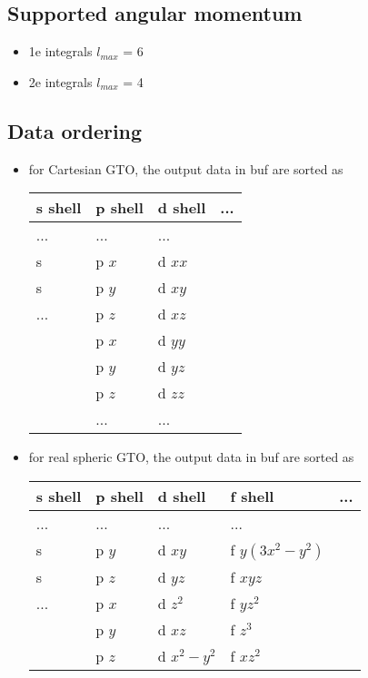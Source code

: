 \documentclass{article}
\begin{document}
\subsection{Supported angular momentum}

\begin{itemize}
\item
  1e integrals $l_{max}$ = 6
\item
  2e integrals $l_{max}$ = 4
\end{itemize}
\subsection{Data ordering}

\begin{itemize}
\item
  for Cartesian GTO, the output data in buf are sorted
  as\\\begin{tabular}{l|l|l|l}
\hline
    s shell & p shell & d shell & ... \\
\hline
    ...     & ...     & ...     & \\
    s       & p $x$   & d $xx$  & \\
    s       & p $y$   & d $xy$  & \\
    ...     & p $z$   & d $xz$  & \\
            & p $x$   & d $yy$  & \\
            & p $y$   & d $yz$  & \\
            & p $z$   & d $zz$  & \\
            & ...     & ...     & \\
\hline
\end{tabular}
\item
  for real spheric GTO, the output data in buf are sorted
  as\\\begin{tabular}{l|l|l|l|l}
\hline
    s shell & p shell & d shell     & f shell         & ... \\
\hline
    ...     & ...     & ...         & ...             & \\
    s       & p $y$   & d $xy     $ & f $y(3x^2-y^2)$ & \\
    s       & p $z$   & d $yz     $ & f $xyz        $ & \\
    ...     & p $x$   & d $z^2    $ & f $yz^2       $ & \\
            & p $y$   & d $xz     $ & f $z^3        $ & \\
            & p $z$   & d $x^2-y^2$ & f $xz^2       $ & \\

\end{tabular}
\end{itemize}
\end{document}
